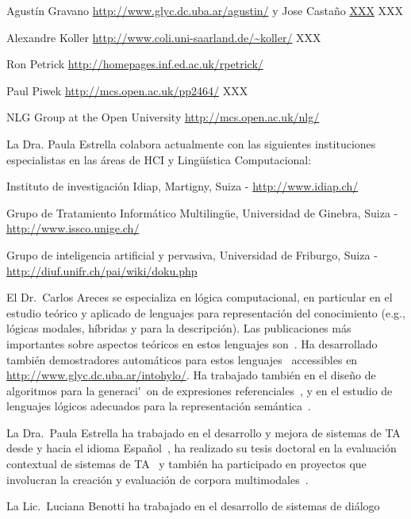 Agust\'in Gravano \url{http://www.glyc.dc.uba.ar/agustin/} y
Jose Casta\~no \url{XXX} XXX

Alexandre Koller \url{http://www.coli.uni-saarland.de/~koller/} XXX

Ron Petrick \url{http://homepages.inf.ed.ac.uk/rpetrick/}

Paul Piwek \url{http://mcs.open.ac.uk/pp2464/} XXX

NLG Group at the Open University \url{http://mcs.open.ac.uk/nlg/}

La Dra. Paula Estrella colabora actualmente con las siguientes instituciones especialistas en las \'areas de HCI y  Ling\"u\'istica Computacional:
\begin{myitemize}
    \item  Instituto de investigaci\'on Idiap, Martigny, Suiza -  \url{http://www.idiap.ch/}
\item Grupo de Tratamiento Inform\'atico Multiling\"ue, Universidad de Ginebra, Suiza - \url{http://www.issco.unige.ch/}
\item Grupo de inteligencia artificial y pervasiva, Universidad de Friburgo, Suiza - \url{http://diuf.unifr.ch/pai/wiki/doku.php}
\end{myitemize}

\begin{myitemize}

\item El Dr.\ Carlos Areces se especializa en l\'ogica computacional,
en particular en el estudio te\'orico y aplicado de lenguajes para
representaci\'on del conocimiento (e.g., l\'ogicas modales, h\'ibridas y
para la descripci\'on).  Las publicaciones
m\'as importantes sobre aspectos te\'oricos en estos lenguajes
son~\citep{ABM01,arec:hybr05b}.  Ha desarrollado tambi\'en demostradores
autom\'aticos para estos lenguajes~\citep{ANR01,arec:hylo02a,AG06,Hoffmann2007}
accessibles en \url{http://www.glyc.dc.uba.ar/intohylo/}.
Ha trabajado tambi\'en en el dise\~no de algoritmos para la generaci\'~on de
expresiones referenciales~\citep{AKS08}, y en el estudio de lenguajes l\'ogicos
adecuados para la representaci\'on sem\'antica~\citep{AF08}.



\item La Dra.\ Paula Estrella ha trabajado en el desarrollo y mejora de sistemas de TA desde y hacia el idioma Espa\~nol~\citep{estr:expe05}, ha realizado su tesis doctoral en la evaluaci\'on contextual de sistemas de TA~\citep{estr:impr08, estr:femt09} y tambi\'en ha participado en proyectos que involucran la creaci\'on y evaluaci\'on de corpora multimodales~\citep{pope:estr07}.

\item La Lic.\ Luciana Benotti ha trabajado en el desarrollo de sistemas de di\'alogo~\citep{benotti07,benotti09b}

\citep{benotti09c}

\end{myitemize}
